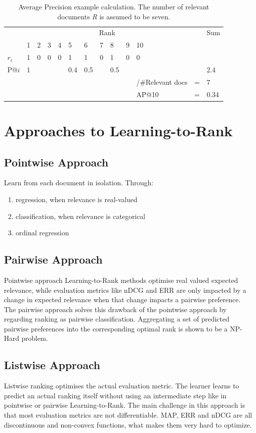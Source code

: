 \begin{table}
\begin{tabular}{lllllllllllll}
 & \multicolumn{10}{c}{Rank} &  & Sum \\ 
\cline{2-11}
 & 1 & 2 & 3 & 4 & 5 & 6 & 7 & 8 & 9 & 10 &  &  \\ 
\hline
$r_i$ & 1 & 0 & 0 & 0 & 1 & 1 & 0 & 1 & 0 & 0 &  &  \\ 
P@$i$ & 1 &  &  &  & 0.4 & 0.5 &  & 0.5 &  &  &  & 2.4 \\ 
\hline
 &  &  &  &  &  &  &  &  &  & /\#Relevant docs & = & 7 \\ 
 &  &  &  &  &  &  &  &  &  & AP@10 & = & 0.34 \\ 
\end{tabular}
\caption{Average Precision example calculation. The number of relevant documents \emph{R} is assumed to be seven.}
\label{tab:example_calculation_AP}
\end{table}

\chapter{Approaches to Learning-to-Rank}
\section{Pointwise Approach}
Learn from each document in isolation.
Through:
	\begin{enumerate}
	\item regression, when relevance is real-valued
	\item classification, when relevance is categorical
	\item ordinal regression
	\end{enumerate}
\section{Pairwise Approach}
Pointwise approach Learning-to-Rank methods optimise real valued expected relevance, while evaluation metrics like \ac{nDCG} and \ac{ERR} are only impacted by a change in expected relevance when that change impacts a pairwise preference. The pairwise approach solves this drawback of the pointwise approach by regarding ranking as pairwise classification. Aggregating a set of predicted pairwise preferences into the corresponding optimal rank is shown to be a NP-Hard problem. 
\section{Listwise Approach}
Listwise ranking optimises the actual evaluation metric. The learner learns to predict an actual ranking itself without using an intermediate step like in pointwise or pairwise Learning-to-Rank. The main challenge in this approach is that most evaluation metrics are not differentiable. \ac{MAP}, \ac{ERR} and \ac{nDCG} are all discontinuous and non-convex functions, what makes them very hard to optimize.
